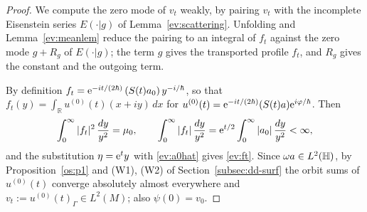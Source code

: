 \begin{proof} We compute the zero mode of $v_t$ weakly, by pairing $v_t$ with the incomplete Eisenstein series $E(\cdot|g)$ of
Lemma~\ref{ev:scattering}. Unfolding and Lemma~\ref{ev:meanlem} reduce the pairing to an integral of $f_t$ against the zero mode
$g+R_g$ of $E(\cdot|g)$; the term $g$ gives the transported profile $f_t$, and $R_g$ gives the constant and the outgoing term.

By definition $f_t=\mathrm{e}^{-it/(2\hbar)}\,(S(t)a_0)\,y^{-i/\hbar}$,
so that $f_t(y)=\int_{\mathbb R}u^{(0)}(t)(x+iy)\,dx$ for $u^{(0)}(t)=\mathrm{e}^{-it/(2\hbar)}(S(t)a)\mathrm{e}^{i\varphi/\hbar}$. Then
\[
  \int_0^\infty|f_t|^2\,\frac{dy}{y^2}=\mu_0,\qquad\int_0^\infty|f_t|\,\frac{dy}{y^2}=\mathrm{e}^{t/2}\int_0^\infty|a_0|\,\frac{dy}{y^2}<\infty,
\]
and the substitution $\eta=\mathrm{e}^ty$ with \eqref{ev:a0hat} gives \eqref{ev:ft}.
Since $\omega a\in L^2(\mathbb{H})$, by Proposition~\ref{os:p1} and (W1), (W2) of Section~\ref{subsec:dd-surf} the orbit sums of
$u^{(0)}(t)$ converge absolutely almost everywhere and $v_t:=u^{(0)}(t)_\Gamma\in L^2(M)$; also $\psi(0)=v_0$.


\end{proof}
